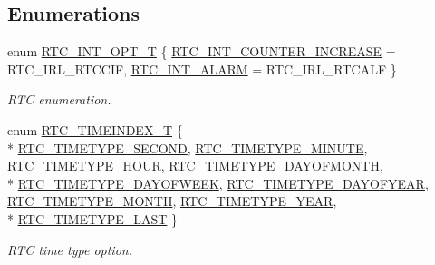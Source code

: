 \subsection*{Enumerations}
\begin{DoxyCompactItemize}
\item 
enum \hyperlink{group__RTC__17XX__40XX_gacbb4f3e21ac0f90878c95afe11f49161}{R\+T\+C\+\_\+\+I\+N\+T\+\_\+\+O\+P\+T\+\_\+T} \{ \hyperlink{group__RTC__17XX__40XX_ggacbb4f3e21ac0f90878c95afe11f49161a1545f38fd2671cb7521a77e7da3bde4d}{R\+T\+C\+\_\+\+I\+N\+T\+\_\+\+C\+O\+U\+N\+T\+E\+R\+\_\+\+I\+N\+C\+R\+E\+A\+SE} = R\+T\+C\+\_\+\+I\+R\+L\+\_\+\+R\+T\+C\+C\+IF, 
\hyperlink{group__RTC__17XX__40XX_ggacbb4f3e21ac0f90878c95afe11f49161adec1af649886bf5a419d636276ca54a5}{R\+T\+C\+\_\+\+I\+N\+T\+\_\+\+A\+L\+A\+RM} = R\+T\+C\+\_\+\+I\+R\+L\+\_\+\+R\+T\+C\+A\+LF
 \}\begin{DoxyCompactList}\small\item\em R\+TC enumeration. \end{DoxyCompactList}
\item 
enum \hyperlink{group__RTC__17XX__40XX_ga8144898fe628404d396db06dc8aac0e0}{R\+T\+C\+\_\+\+T\+I\+M\+E\+I\+N\+D\+E\+X\+\_\+T} \{ \\*
\hyperlink{group__RTC__17XX__40XX_gga8144898fe628404d396db06dc8aac0e0ac0bdc1ff011be37cfeecb77c241e7fb8}{R\+T\+C\+\_\+\+T\+I\+M\+E\+T\+Y\+P\+E\+\_\+\+S\+E\+C\+O\+ND}, 
\hyperlink{group__RTC__17XX__40XX_gga8144898fe628404d396db06dc8aac0e0a11974e5996bfe6fbf0381d7ef3836964}{R\+T\+C\+\_\+\+T\+I\+M\+E\+T\+Y\+P\+E\+\_\+\+M\+I\+N\+U\+TE}, 
\hyperlink{group__RTC__17XX__40XX_gga8144898fe628404d396db06dc8aac0e0a4e88c263358395fecc19306556addacc}{R\+T\+C\+\_\+\+T\+I\+M\+E\+T\+Y\+P\+E\+\_\+\+H\+O\+UR}, 
\hyperlink{group__RTC__17XX__40XX_gga8144898fe628404d396db06dc8aac0e0a3cc8b55755f86e8a6a1a870a79122324}{R\+T\+C\+\_\+\+T\+I\+M\+E\+T\+Y\+P\+E\+\_\+\+D\+A\+Y\+O\+F\+M\+O\+N\+TH}, 
\\*
\hyperlink{group__RTC__17XX__40XX_gga8144898fe628404d396db06dc8aac0e0a88f328753d58927fafd45b35e0815e80}{R\+T\+C\+\_\+\+T\+I\+M\+E\+T\+Y\+P\+E\+\_\+\+D\+A\+Y\+O\+F\+W\+E\+EK}, 
\hyperlink{group__RTC__17XX__40XX_gga8144898fe628404d396db06dc8aac0e0ad05ce02297b482d4fa5b6a491ff04aff}{R\+T\+C\+\_\+\+T\+I\+M\+E\+T\+Y\+P\+E\+\_\+\+D\+A\+Y\+O\+F\+Y\+E\+AR}, 
\hyperlink{group__RTC__17XX__40XX_gga8144898fe628404d396db06dc8aac0e0a45d2078908fb25a714cbd01766f55fae}{R\+T\+C\+\_\+\+T\+I\+M\+E\+T\+Y\+P\+E\+\_\+\+M\+O\+N\+TH}, 
\hyperlink{group__RTC__17XX__40XX_gga8144898fe628404d396db06dc8aac0e0a780e93b1c505ed02ed139894566fcfe0}{R\+T\+C\+\_\+\+T\+I\+M\+E\+T\+Y\+P\+E\+\_\+\+Y\+E\+AR}, 
\\*
\hyperlink{group__RTC__17XX__40XX_gga8144898fe628404d396db06dc8aac0e0a0d4fafef57b6ef363f9a0875ff339cad}{R\+T\+C\+\_\+\+T\+I\+M\+E\+T\+Y\+P\+E\+\_\+\+L\+A\+ST}
 \}\begin{DoxyCompactList}\small\item\em R\+TC time type option. \end{DoxyCompactList}
\end{DoxyCompactItemize}
